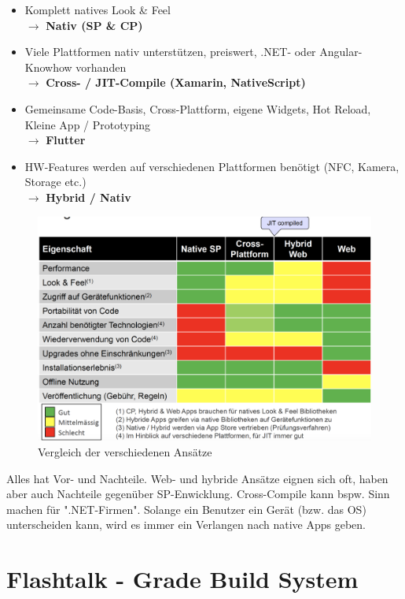 \documentclass[a4paper]{article}
\begin{document}
{\begin{itemize}
		\item Komplett natives Look \& Feel \\
		$\rightarrow$ \textbf{Nativ (SP \& CP)}
		
		\item Viele Plattformen nativ unterstützen, preiswert, .NET- oder Angular-Knowhow vorhanden \\
		$\rightarrow$ \textbf{Cross- / JIT-Compile (Xamarin, NativeScript)}
		
		\item Gemeinsame Code-Basis, Cross-Plattform, eigene Widgets, Hot Reload, Kleine App / Prototyping \\
		$\rightarrow$ \textbf{Flutter}
		
		\item HW-Features werden auf verschiedenen Plattformen benötigt (NFC, Kamera, Storage etc.) \\
		$\rightarrow$ \textbf{Hybrid / Nativ}
		
	\end{itemize}
	
	\begin{figure}[!htb]
		\centering
		\includegraphics[width=.8\textwidth]{img/android8/ansatze_vergleich.png}
		\caption{Vergleich der verschiedenen Ansätze}
		\label{fig:ansatze_vergleich}
	\end{figure}
	\noindent
	Alles hat Vor- und Nachteile.
	Web- und hybride Ansätze eignen sich oft, haben aber auch Nachteile gegenüber SP-Enwicklung.
	Cross-Compile kann bspw. Sinn machen für ".NET-Firmen".
	Solange ein Benutzer ein Gerät (bzw. das OS) unterscheiden kann, wird es immer ein Verlangen nach native Apps geben. 
	
	\newpage
	
\section{Flashtalk - Grade Build System}

}
\end{document}
